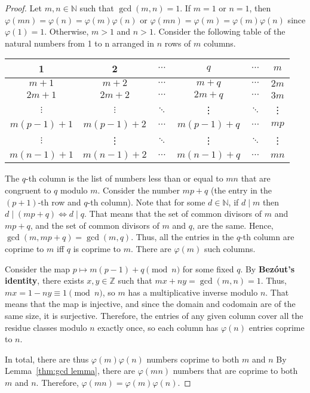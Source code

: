 \documentclass[a4paper]{article}
\theoremstyle{definition}
\begin{document}
\begin{proof}
    Let $m,n \in \mathbb{N}$ such that $\gcd(m,n) = 1$.
    If $m = 1$ or $n = 1$, then $\varphi(mn) = \varphi(n) = \varphi(m)\varphi(n)$ or $\varphi(mn) = \varphi(m) = \varphi(m)\varphi(n)$ since $\varphi(1) = 1$.
    Otherwise, $m > 1$ and $n > 1$.
    Consider the following table of the natural numbers from 1 to n arranged in $n$ rows of $m$ columns.
    \begin{center}
        \begin{tabular}{|c|c|c|c|c|c|}
            \hline
            1            & 2            & $\cdots$ & $q$          & $\cdots$ & $m$    \\
            \hline
            $m+1$        & $m+2$        & $\cdots$ & $m+q$        & $\cdots$ & $2m$   \\
            \hline
            $2m+1$       & $2m+2$       & $\cdots$ & $2m+q$       & $\cdots$ & $3m$   \\
            \hline
            $\vdots$     & $\vdots$     & $\ddots$ & \vdots       & $\ddots$ & \vdots \\
            \hline
            $m(p-1) + 1$ & $m(p-1) + 2$ & $\cdots$ & $m(p-1) + q$ & $\cdots$ & $mp$   \\
            \hline
            $\vdots$     & \vdots       & $\ddots$ & \vdots       & $\ddots$ & \vdots \\
            \hline
            $m(n-1) + 1$ & $m(n-1) + 2$ & $\cdots$ & $m(n-1) + q$ & $\cdots$ & $mn$   \\
            \hline
        \end{tabular}
    \end{center}
    The $q$-th column is the list of numbers less than or equal to $mn$ that are congruent to $q$ modulo $m$.
    Consider the number $mp + q$ (the entry in the $(p+1)$-th row and $q$-th column).
    Note that for some $d \in \mathbb{N}$, if $d \mid m$ then $d \mid (mp + q) \iff d \mid q$.
    That means that the set of common divisors of $m$ and $mp + q$, and the set of common divisors of $m$ and $q$, are the same.
    Hence, $\gcd(m, mp+q) = \gcd(m, q)$.
    Thus, all the entries in the $q$-th column are coprime to $m$ iff $q$ is coprime to $m$.
    There are $\varphi(m)$ such columns.

    Consider the map $p \mapsto m(p-1) + q \pmod n$ for some fixed $q$.
    By \textbf{Bez\'out's identity}, there exists $x,y \in \mathbb{Z}$ such that $mx + ny = \gcd(m,n) = 1$.
    Thus, $mx = 1 - ny \equiv 1 \pmod n$, so $m$ has a multiplicative inverse modulo $n$.
    That means that the map is injective, and since the domain and codomain are of the same size, it is surjective.
    Therefore, the entries of any given column cover all the residue classes modulo $n$ exactly once, so each column has $\varphi(n)$ entries coprime to $n$.

    In total, there are thus $\varphi(m)\varphi(n)$ numbers coprime to both $m$ and $n$
    By Lemma~\ref{thm:gcd lemma}, there are $\varphi(mn)$ numbers that are coprime to both $m$ and $n$.
    Therefore, $\varphi(mn) = \varphi(m)\varphi(n)$.
\end{proof}
\end{document}
